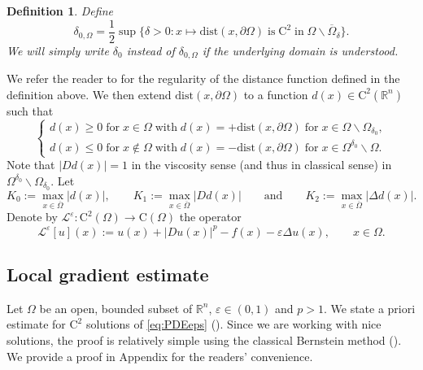 \documentclass[12pt,reqno]{amsart}
\numberwithin{figure}{section}
\theoremstyle{plain}
\newtheorem{defn}{Definition}
\theoremstyle{remark}
\numberwithin{equation}{section}
\newcommand{\R}{\mathbb{R}}
\newcommand{\rmC}{\mathrm{C}}
\begin{document}
\begin{defn} Define
\begin{equation}\label{def:delta_0}
    \delta_{0,\Omega} =\frac{1}{2}\sup \big\{ \delta > 0: x\mapsto\mathrm{dist}(x,\partial\Omega)\;\text{is}\;\rmC^2\;\text{in}\;\Omega\backslash\overline{\Omega}_{\delta} \big\}.
\end{equation}
We will simply write $\delta_0$ instead of $\delta_{0,\Omega}$ if the underlying domain is understood.
\end{defn}

We refer the reader to \cite{gilbarg_elliptic_2001} for the regularity of the distance function defined in the definition above. We then extend $\mathrm{dist}(x,\partial\Omega)$ to a function $d(x)\in \mathrm{C}^2(\mathbb{R}^n)$ such that 
\begin{equation}\label{e:distance_def}
    \begin{cases}
    d(x)\geq 0\;\text{for}\;x\in\Omega\;\text{with}\;d(x) = +\mathrm{dist}(x,\partial\Omega)\;\text{for}\;x\in \Omega\backslash \Omega_{\delta_0},\\
    d(x)\leq 0\;\text{for}\;x\notin \Omega\;\text{with}\;d(x) = -\mathrm{dist}(x,\partial\Omega)\;\text{for}\;x\in \Omega^{\delta_0}\backslash \Omega.
    \end{cases}
\end{equation}
Note that $|D d(x)| = 1$ in the viscosity sense (and thus in classical sense) in $\Omega^{\delta_0}\backslash \Omega_{\delta_0}$. Let 
\begin{equation}\label{boundond}
   K_0:= \max_{x\in \overline{\Omega}}|d(x)|, \qquad K_1 := \max_{x\in \overline{\Omega}} |D d(x)| \qquad\text{and}\qquad K_2 := \max_{x\in \overline{\Omega}} |\Delta d(x)|.
\end{equation}
\noindent Denote by $\mathcal{L}^\varepsilon:\rmC^2(\Omega)\to \rmC(\Omega)$ the operator
\begin{equation*}
    \mathcal{L}^\varepsilon[u](x) :=   u(x) + |Du(x)|^p - f(x) - \varepsilon \Delta u(x), \qquad x\in \Omega.
\end{equation*}



\subsection{Local gradient estimate} Let $\Omega$ be an open, bounded subset of $\R^n$, $\varepsilon \in (0,1)$ and $p>1$. We state a priori estimate for $\rmC^2$ solutions of \eqref{eq:PDEeps} (\cite[Appendix]{Lasry1989}). Since we are working with nice solutions, the proof is relatively simple using the classical Bernstein method (\cite{bernstein_sur_1910}). We provide a proof in Appendix for the readers' convenience. 
\end{document}
